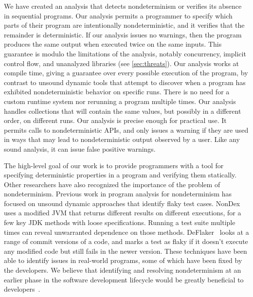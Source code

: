 We have created an analysis that detects nondeterminism or verifies its
absence in sequential programs.
Our analysis permits a programmer to specify which parts of their program
are intentionally nondeterministic, and it verifies that the remainder is deterministic.
%
If our analysis issues no warnings, then the program produces the same
output when executed twice on the same inputs.  This guarantee is modulo
the limitations of the
analysis, notably concurrency, implicit control flow, and unanalyzed libraries (see \cref{sec:threats}).
%
Our analysis works at compile time, giving a guarantee over every possible
execution of the program, by contrast to unsound dynamic tools that attempt
to discover when a program has exhibited nondeterministic behavior on
specific runs.  There is no need for a custom runtime system nor rerunning a program
multiple times.
%
Our analysis handles collections that will contain the same values, but
possibly in a different order, on different runs.
%
Our analysis is precise enough for practical use.  It permits calls to
nondeterministic APIs, and only issues a warning if they are used in ways
that may lead to nondeterministic output observed by a user.  Like any
sound analysis, it can issue false positive warnings.



The high-level goal of our work is to provide programmers with a tool for
specifying deterministic properties in a program and verifying them
statically.
%
Other researchers have also recognized the importance of the problem of nondeterminism.
Previous work in program analysis for nondeterminism has focused on unsound dynamic
approaches that identify flaky test cases.
NonDex~\cite{nondex} uses a modified JVM that returns different results on different
executions, for a few key JDK methods with loose specifications.  Running a
test suite multiple times can reveal unwarranted dependence on those
methods.
DeFlaker~\cite{deflaker} looks at a range of commit versions
of a code, and marks a test as flaky if it doesn't execute any modified code but still fails in the newer version. These techniques
have been able to identify issues in real-world programs, some of which
have been fixed by the developers. We believe that identifying and
resolving nondeterminism
at an earlier phase in the software development lifecycle would be greatly beneficial to
developers~\cite{briski2008minimizing}.

